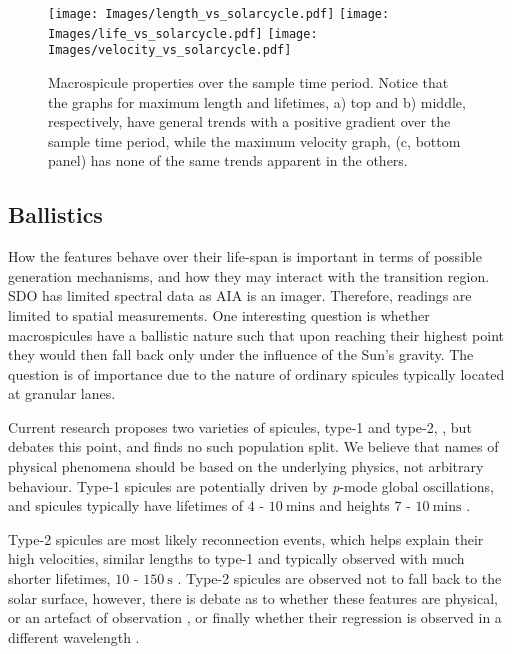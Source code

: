 \begin{figure}[h]
	\centering
	\texttt{[image: Images/length\_vs\_solarcycle.pdf]}
	\texttt{[image: Images/life\_vs\_solarcycle.pdf]}
	\texttt{[image: Images/velocity\_vs\_solarcycle.pdf]}
	\caption{\small Macrospicule properties over the sample time period. Notice that the graphs for maximum length and lifetimes, a) top and b) middle, respectively, have general trends with a positive gradient over the sample time period, while the maximum velocity graph, (c, bottom panel) has none of the same trends apparent in the others.}
	\label{fig:sol-cyc-rels}
\end{figure}


\subsection{Ballistics}
How the features behave over their life-span is important in terms of possible generation mechanisms, and how they may interact with the transition region. SDO has limited spectral data as AIA is an imager. Therefore, readings are limited to spatial measurements. One interesting question is whether macrospicules have a ballistic nature such that upon reaching their highest point they would then fall back only under the influence of the Sun's gravity. The question is of importance due to the nature of ordinary spicules typically located at granular lanes.

Current research proposes two varieties of spicules, type-1 and type-2, \citealt{Pereira2012}, but \citealt{Zhang2012} debates this point, and finds no such population split. We believe that names of physical phenomena should be based on the underlying physics, not arbitrary behaviour. Type-1 spicules are potentially driven by \emph{p}-mode global oscillations, and spicules typically have lifetimes of $4$ - $10\ \textrm{mins}$ and heights $7$ - $10\ \textrm{mins}$ \citep{dePontieu&Erdelyi2004}.

Type-2 spicules are most likely reconnection events, which helps explain their high velocities, similar lengths to type-1 and typically observed with much shorter lifetimes, $10$ - $150\ \textrm{s}$ \citep{Isobe2008}. Type-2 spicules are observed not to fall back to the solar surface, however, there is debate as to whether these features are physical, or an artefact of observation \citep{Tsiropoula2012}, \citep{Sekse2013} or finally whether their regression is observed in a different wavelength \citep{Pereira2014}.


